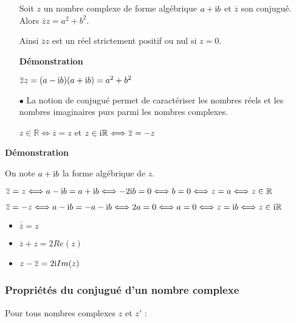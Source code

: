 \begin{corollary}
\begin{itemize}
\item[\bullet]
Soit $ z $ un nombre complexe de forme algébrique  $ a+ \text{i} b$ et $ \overline{z} $ son conjugué. Alors $ \overline{z} z=a^2+b^2 $.


\medskip

Ainsi $  \overline{z} z $  est un réel strictement positif ou nul si $ z=0 $.
\medskip

\textbf{Démonstration}

\medskip

$ \overline{z} z= (a- \text{i} b)(a+ \text{i} b) =a^2+b^2 $


\medskip
\item[$  \bullet$] La notion de conjugué permet de caractériser les  nombres réels et les nombres imaginaires purs parmi les nombres complexes.

\medskip
\hspace*{2cm} $ z\in\mathbb{R} \Longleftrightarrow \overline{z} =z $
\quad et \quad  $ z\in\text{i}\mathbb{R} \Longleftrightarrow \overline{z} =-z $

\end{itemize}
\end{corollary}
\textbf{Démonstration}

\medskip

On note $ a+ \text{i} b$ la forme algébrique de $ z $.


\medskip
 $ \overline{z} =z \Longleftrightarrow a- \text{i} b =a+ \text{i} b \Longleftrightarrow -2\text{i} b=0 \Longleftrightarrow b=0 \Longleftrightarrow z=a \Longleftrightarrow z\in\mathbb{R} $


\medskip
 $ \overline{z} =-z \Longleftrightarrow a- \text{i} b =-a- \text{i} b \Longleftrightarrow 2a=0 \Longleftrightarrow a=0 \Longleftrightarrow z=\text{i} b \Longleftrightarrow z\in\text{i}\mathbb{R} $


\medskip

\begin{remark}
\begin{itemize}
\item $ \overline{\overline{z}}=z $
\item $ \overline{z} +z=2 Re(z)$
\item $ z-\overline{z} =2 \text{i} Im(z)$
\end{itemize}

\end{remark}
\subsubsection*{Propriétés du conjugué d'un nombre complexe}
Pour tous nombres complexes $z $ et $z' $ :

